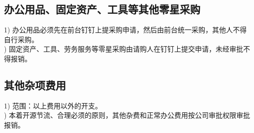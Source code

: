 \documentclass[scheme=plain,UTF8]{ctexart}
\begin{document}




\subsection{办公用品、固定资产、工具等其他零星采购}
1) 办公用品必须先在前台钉钉上提采购申请，然后由前台统一采购，其他人不得自行采购。\\) 固定资产、工具、劳务服务等零星采购由请购人在钉钉上提交申请，未经审批不得报销。

\subsection{其他杂项费用}

1)	范围：以上费用以外的开支。\\)	本着开源节流、合理必须的原则，其他杂费和正常办公费用按公司审批权限审批报销。
\end{document}
